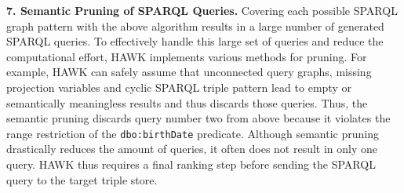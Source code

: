 \textbf{7. Semantic Pruning of SPARQL Queries.}
Covering each possible SPARQL graph pattern with the above algorithm results in a large number of generated SPARQL queries.
To effectively handle this large set of queries and reduce the computational effort, HAWK implements various methods for pruning. 
For example, HAWK can safely assume that unconnected query graphs, missing projection variables and cyclic SPARQL triple pattern lead to empty or semantically meaningless results and thus discards those queries.
Thus, the semantic pruning discards query number two from above because it violates the range restriction of the \texttt{dbo:birthDate} predicate.
Although semantic pruning drastically reduces the amount of queries, it often does not result in only one query. HAWK thus requires a final ranking step before sending the SPARQL query to the target triple store.

